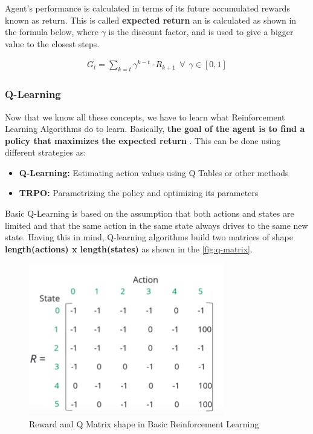 			Agent's performance is calculated in terms of its future accumulated rewards known as return. This is called \textbf{expected return} an is calculated as  shown in the formula below, where $\gamma$ is the discount factor, and is used to give a bigger value to the closest steps.
			
			\begin{gather*}
				G_t = \sum_{k=t} \gamma ^{k-t} \cdot R_{k+1} \:\: \forall \:\: \gamma \in [0, 1]
			\end{gather*}
		
		
		\subsubsection{Q-Learning}
			
			Now that we know all these concepts, we have to learn what Reinforcement Learning Algorithms do to learn. Basically, \textbf{the goal of the agent is to find a policy that maximizes the expected return }. This can be done using different strategies as:
			\begin{itemize}
				\item[\textendash]\textbf{Q-Learning:} Estimating action values using Q Tables or other methods
				\item[\textendash]\textbf{TRPO:} Parametrizing the policy and optimizing its parameters
			\end{itemize}
			
			Basic Q-Learning is based on the assumption that both actions and states are limited and that the same action in the same state always drives to the same new state. Having this in mind, Q-learning algorithms build two matrices of shape \textbf{length(actions) x length(states)} as shown in the \autoref{fig:q-matrix}.
			
			\begin{figure}[h]
				\centering
				\includegraphics[width=0.7\linewidth]{Images/Q-Matrix}
				\caption[Q-Matrix]{Reward and Q Matrix shape in Basic Reinforcement Learning}
				\label{fig:q-matrix}
			\end{figure}
			
